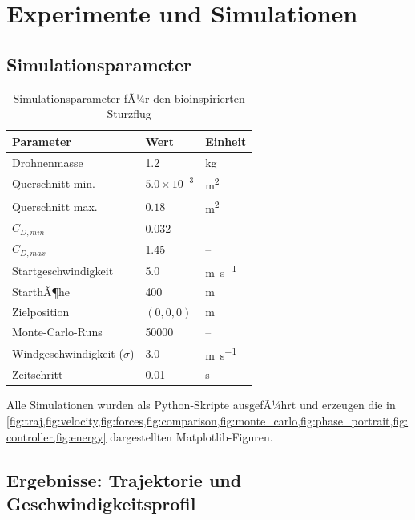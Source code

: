 ﻿\documentclass[12pt,a4paper]{article}
\theoremstyle{remark}
\begin{document}
	\section{Experimente und Simulationen}
	\label{sec:experimente}
	
	\subsection{Simulationsparameter}
	
	\begin{table}[H]
		\centering
		\caption{Simulationsparameter fÃ¼r den bioinspirierten Sturzflug}
		\label{tab:simparams}
		\begin{tabular}{lll}
			\toprule
			\textbf{Parameter} & \textbf{Wert} & \textbf{Einheit} \\
			\midrule
			Drohnenmasse & 1.2 & \si{\kg} \\
			Querschnitt min. & $5.0 \times 10^{-3}$ & \si{\m^2} \\
			Querschnitt max. & $0.18$ & \si{\m^2} \\
			$C_{D,min}$ & 0.032 & -- \\
			$C_{D,max}$ & 1.45 & -- \\
			Startgeschwindigkeit & 5.0 & \si{\m\per\second} \\
			StarthÃ¶he & 400 & \si{\m} \\
			Zielposition & $(0, 0, 0)$ & \si{\m} \\
			Monte-Carlo-Runs & 50000 & -- \\
			Windgeschwindigkeit ($\sigma$) & 3.0 & \si{\m\per\second} \\
			Zeitschritt & 0.01 & \si{\second} \\
			\bottomrule
		\end{tabular}
	\end{table}
	
	Alle Simulationen wurden als Python-Skripte ausgefÃ¼hrt und erzeugen die in \cref{fig:traj,fig:velocity,fig:forces,fig:comparison,fig:monte_carlo,fig:phase_portrait,fig:controller,fig:energy} dargestellten Matplotlib-Figuren.
	
	\subsection{Ergebnisse: Trajektorie und Geschwindigkeitsprofil}
	
\end{document}
